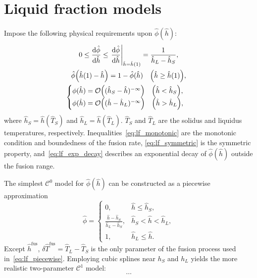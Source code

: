\documentclass{article}
\newcommand{\fusion}[1]{{#1}^\mathrm{fus}}
\begin{document}

\section{Liquid fraction models}

Impose the following physical requirements upon \(\hat\phi(\hat{h})\):
\begin{gather}
    0 \leq \dv{\hat\phi}{\hat{h}} \leq \eval{\dv{\hat\phi}{\hat{h}}}_{\hat{h}=\hat{h}(1)} =
        \frac1{\hat{h}_L-\hat{h}_S}, \label{eq:lf_monotonic}\\
    \hat\phi\qty(\hat{h}(1) - \hat{h}) = 1 - \hat\phi(\hat{h}) \quad \qty(\hat{h}\geq\hat{h}(1)), \label{eq:lf_symmetric}\\
    \begin{cases}
	\phi(\hat{h}) = \order{(\hat{h}_S-\hat{h})^{-\infty}} \quad \qty(\hat{h} < \hat{h}_S), \\
	    \phi(\hat{h}) = \order{(\hat{h}-\hat{h}_L)^{-\infty}} \quad \qty(\hat{h} > \hat{h}_L),
	\end{cases}\label{eq:lf_exp_decay}
\end{gather}
where \(\hat{h}_S = \hat{h}(\hat{T}_S)\) and \(\hat{h}_L = \hat{h}(\hat{T}_L)\).
\(\hat{T}_S\) and \(\hat{T}_L\) are the solidus and liquidus temperatures, respectively.
Inequalities~\eqref{eq:lf_monotonic} are the monotonic condition and boundedness of the fusion rate,
\eqref{eq:lf_symmetric} is the symmetric property,
and~\eqref{eq:lf_exp_decay} describes an exponential decay of \(\hat\phi(\hat{h})\) outside the fusion range.

The simplest \(\mathcal{C}^0\) model for \(\hat{\phi}(\hat{h})\) can be constructed as a piecewise approximation
\begin{equation}\label{eq:lf_piecewise}
	\hat{\phi} = \begin{cases}
        0,                                             & \hat{h} \leq \hat{h}_S, \\
        \frac{\hat{h}-\hat{h}_S}{\hat{h}_L-\hat{h}_S}, & \hat{h}_S < \hat{h} < \hat{h}_L, \\
        1,                                             & \hat{h}_L \leq \hat{h}.
    \end{cases}
\end{equation}
Except \(\fusion{\hat{h}}\), \(\delta\fusion{\hat{T}} = \hat{T}_L - \hat{T}_S\)
is the only parameter of the fusion process  used in~\eqref{eq:lf_piecewise}.
Employing cubic splines near \(h_S\) and \(h_L\) yields the more realistic two-parameter \(\mathcal{C}^1\) model:
\begin{equation}\label{eq:lf_splines}
	\dots
\end{equation}
\end{document}
